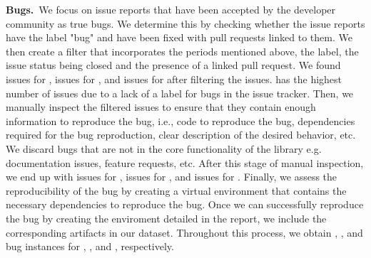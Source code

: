 \documentclass[sigconf,screen]{acmart}
\begin{document}



\textbf{Bugs.}~We focus on issue reports that have been accepted by
the developer community as true bugs. We determine this by checking
whether the issue reports have the label "bug" and have been fixed with pull
requests linked to them. We then create a filter that incorporates
the periods mentioned above, the label, the issue status being closed
and the presence of a linked pull request. We found \numtorchfiltered{}
issues for \torch, \numtffiltered{} issues for \tf, and \numjaxfiltered{}
issues for \jax after filtering the issues. \torch has the highest number
of issues due to a lack of a label for bugs in the issue tracker.
Then, we manually inspect the filtered issues to ensure that they
contain enough information to reproduce the bug, i.e., code to
reproduce the bug, dependencies required for the bug reproduction,
clear description of the desired behavior, etc. We discard bugs that
are not in the core functionality of the library e.g. documentation
issues, feature requests, etc. After this stage of manual inspection,
we end up with \numtorchinspected{} issues for \torch,
\numtfinspected{} issues for \tf, and \numjaxinspected{} issues for
\jax.
%
Finally, we assess the reproducibility of the bug by creating a
virtual environment that contains the necessary dependencies to
reproduce the bug.  Once we can successfully reproduce the bug by
creating the enviroment detailed in the report, we include the
corresponding artifacts in our dataset. Throughout this process, we
obtain \textbf{\numjaxbugs{}}, \textbf{\numtorchbugs{}}, and
\textbf{\numtfbugs{}} bug instances for \jax, \torch, and \tf,
respectively.

\end{document}
